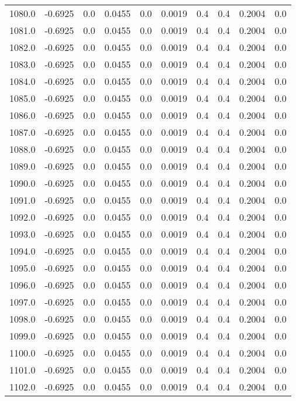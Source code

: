 \begin{longtable}{lrrrrrrrrr}
1080.0 & -0.6925 & 0.0 & 0.0455 & 0.0 & 0.0019 & 0.4 & 0.4 & 0.2004 & 0.0 \\
1081.0 & -0.6925 & 0.0 & 0.0455 & 0.0 & 0.0019 & 0.4 & 0.4 & 0.2004 & 0.0 \\
1082.0 & -0.6925 & 0.0 & 0.0455 & 0.0 & 0.0019 & 0.4 & 0.4 & 0.2004 & 0.0 \\
1083.0 & -0.6925 & 0.0 & 0.0455 & 0.0 & 0.0019 & 0.4 & 0.4 & 0.2004 & 0.0 \\
1084.0 & -0.6925 & 0.0 & 0.0455 & 0.0 & 0.0019 & 0.4 & 0.4 & 0.2004 & 0.0 \\
1085.0 & -0.6925 & 0.0 & 0.0455 & 0.0 & 0.0019 & 0.4 & 0.4 & 0.2004 & 0.0 \\
1086.0 & -0.6925 & 0.0 & 0.0455 & 0.0 & 0.0019 & 0.4 & 0.4 & 0.2004 & 0.0 \\
1087.0 & -0.6925 & 0.0 & 0.0455 & 0.0 & 0.0019 & 0.4 & 0.4 & 0.2004 & 0.0 \\
1088.0 & -0.6925 & 0.0 & 0.0455 & 0.0 & 0.0019 & 0.4 & 0.4 & 0.2004 & 0.0 \\
1089.0 & -0.6925 & 0.0 & 0.0455 & 0.0 & 0.0019 & 0.4 & 0.4 & 0.2004 & 0.0 \\
1090.0 & -0.6925 & 0.0 & 0.0455 & 0.0 & 0.0019 & 0.4 & 0.4 & 0.2004 & 0.0 \\
1091.0 & -0.6925 & 0.0 & 0.0455 & 0.0 & 0.0019 & 0.4 & 0.4 & 0.2004 & 0.0 \\
1092.0 & -0.6925 & 0.0 & 0.0455 & 0.0 & 0.0019 & 0.4 & 0.4 & 0.2004 & 0.0 \\
1093.0 & -0.6925 & 0.0 & 0.0455 & 0.0 & 0.0019 & 0.4 & 0.4 & 0.2004 & 0.0 \\
1094.0 & -0.6925 & 0.0 & 0.0455 & 0.0 & 0.0019 & 0.4 & 0.4 & 0.2004 & 0.0 \\
1095.0 & -0.6925 & 0.0 & 0.0455 & 0.0 & 0.0019 & 0.4 & 0.4 & 0.2004 & 0.0 \\
1096.0 & -0.6925 & 0.0 & 0.0455 & 0.0 & 0.0019 & 0.4 & 0.4 & 0.2004 & 0.0 \\
1097.0 & -0.6925 & 0.0 & 0.0455 & 0.0 & 0.0019 & 0.4 & 0.4 & 0.2004 & 0.0 \\
1098.0 & -0.6925 & 0.0 & 0.0455 & 0.0 & 0.0019 & 0.4 & 0.4 & 0.2004 & 0.0 \\
1099.0 & -0.6925 & 0.0 & 0.0455 & 0.0 & 0.0019 & 0.4 & 0.4 & 0.2004 & 0.0 \\
1100.0 & -0.6925 & 0.0 & 0.0455 & 0.0 & 0.0019 & 0.4 & 0.4 & 0.2004 & 0.0 \\
1101.0 & -0.6925 & 0.0 & 0.0455 & 0.0 & 0.0019 & 0.4 & 0.4 & 0.2004 & 0.0 \\
1102.0 & -0.6925 & 0.0 & 0.0455 & 0.0 & 0.0019 & 0.4 & 0.4 & 0.2004 & 0.0 \\

\end{longtable}
